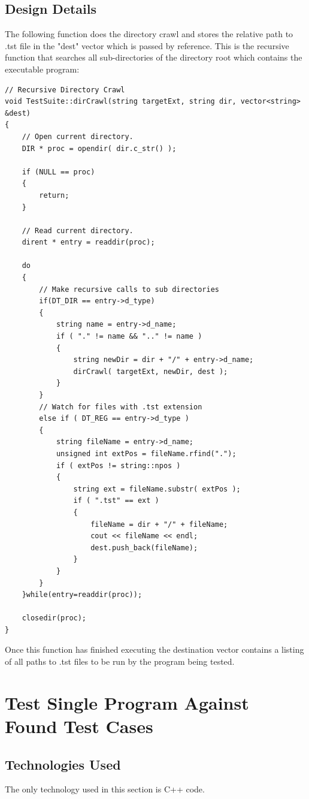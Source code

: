 \subsection{Design Details}
The following function does the directory crawl and stores the relative path to 
 .tst file in the "dest" vector which is passed by reference. This is the recursive function that searches all sub-directories of the directory root which contains the executable program:
\begin{lstlisting}
// Recursive Directory Crawl
void TestSuite::dirCrawl(string targetExt, string dir, vector<string> &dest)
{
    // Open current directory.
    DIR * proc = opendir( dir.c_str() );

    if (NULL == proc)
    {
        return;
    }

    // Read current directory.
    dirent * entry = readdir(proc);

    do
    {
        // Make recursive calls to sub directories
        if(DT_DIR == entry->d_type)
        {
            string name = entry->d_name;
            if ( "." != name && ".." != name )
            {
                string newDir = dir + "/" + entry->d_name;
                dirCrawl( targetExt, newDir, dest );
            }
        }
        // Watch for files with .tst extension
        else if ( DT_REG == entry->d_type )
        {
            string fileName = entry->d_name;
            unsigned int extPos = fileName.rfind(".");
            if ( extPos != string::npos )
            {
                string ext = fileName.substr( extPos );
                if ( ".tst" == ext )
                {
                    fileName = dir + "/" + fileName;
                    cout << fileName << endl;
                    dest.push_back(fileName);
                }
            }
        }
    }while(entry=readdir(proc));

    closedir(proc);
}
\end{lstlisting}
Once this function has finished executing the destination vector contains a listing of all paths to .tst files to be run by the program being tested.



\section{Test Single Program Against Found Test Cases}

\subsection{Technologies  Used}
The only technology used in this section is C++ code.

